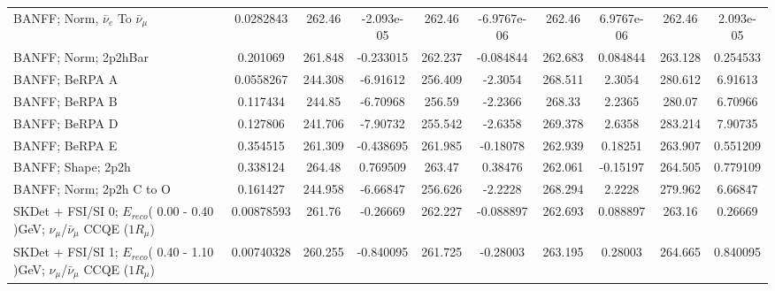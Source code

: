 \begin{tabular}{| l | S | S  S | S  S | S  S | S  S | }
                               BANFF; Norm, $\bar{\nu}_{e}$ To $\bar{\nu}_{\mu}$ &       0.0282843 &          262.46 &      -2.093e-05 &          262.46 &     -6.9767e-06 &          262.46 &      6.9767e-06 &          262.46 &       2.093e-05 \\ 
                                                            BANFF; Norm; 2p2hBar &        0.201069 &         261.848 &       -0.233015 &         262.237 &       -0.084844 &         262.683 &        0.084844 &         263.128 &        0.254533 \\ 
                                                                  BANFF; BeRPA A &       0.0558267 &         244.308 &        -6.91612 &         256.409 &         -2.3054 &         268.511 &          2.3054 &         280.612 &         6.91613 \\ 
                                                                  BANFF; BeRPA B &        0.117434 &          244.85 &        -6.70968 &          256.59 &         -2.2366 &          268.33 &          2.2365 &          280.07 &         6.70966 \\ 
                                                                  BANFF; BeRPA D &        0.127806 &         241.706 &        -7.90732 &         255.542 &         -2.6358 &         269.378 &          2.6358 &         283.214 &         7.90735 \\ 
                                                                  BANFF; BeRPA E &        0.354515 &         261.309 &       -0.438695 &         261.985 &        -0.18078 &         262.939 &         0.18251 &         263.907 &        0.551209 \\ 
                                                              BANFF; Shape; 2p2h &        0.338124 &          264.48 &        0.769509 &          263.47 &         0.38476 &         262.061 &        -0.15197 &         264.505 &        0.779109 \\ 
                                                        BANFF; Norm; 2p2h C to O &        0.161427 &         244.958 &        -6.66847 &         256.626 &         -2.2228 &         268.294 &          2.2228 &         279.962 &         6.66847 \\ 
SKDet + FSI/SI  0; $E_{reco}$( 0.00 - 0.40 )GeV; $\nu_{\mu}$/$\bar{\nu}_{\mu}$ CCQE ($1R_{\mu}$) &      0.00878593 &          261.76 &        -0.26669 &         262.227 &       -0.088897 &         262.693 &        0.088897 &          263.16 &         0.26669 \\ 
SKDet + FSI/SI  1; $E_{reco}$( 0.40 - 1.10 )GeV; $\nu_{\mu}$/$\bar{\nu}_{\mu}$ CCQE ($1R_{\mu}$) &      0.00740328 &         260.255 &       -0.840095 &         261.725 &        -0.28003 &         263.195 &         0.28003 &         264.665 &        0.840095 \\ 

\end{tabular}
